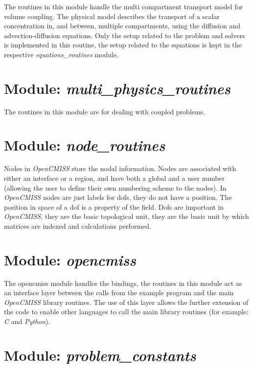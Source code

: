 The routines in this module handle the multi compartment transport model for 
volume coupling. The physical model describes the transport of a scalar 
concentration in, and between, multiple compartments, using the diffusion 
and advection-diffusion equations. Only the setup related to the problem and 
solvers is implemented in this routine, the setup related to the equations 
is kept in the respective \emph{equations\_routines} module. 


\section{Module: \emph{multi\_physics\_routines}}
\label{sec:multiphysicsroutines}

The routines in this module are for dealing with coupled problems.


\section{Module: \emph{node\_routines}}
\label{sec:noderoutines}

Nodes in \emph{OpenCMISS} store the nodal information. Nodes are 
associated with either an interface or a region, and have both a global 
and a user number (allowing the user to define their own numbering scheme 
to the nodes). In \emph{OpenCMISS} nodes are just labels for dofs, they 
do not have a position. The position in space of a dof is a property of 
the field. Dofs are important in \emph{OpenCMISS}, they are the basic 
topological unit, they are the basic unit by which matrices are indexed 
and calculations performed.


\section{Module: \emph{opencmiss}}
\label{sec:opencmiss}

The opencmiss module handles the bindings, the routines in this module act as 
an interface layer between the calls from the example program and the main 
\emph{OpenCMISS} library routines. The use of this layer allows the further 
extension of the code to enable other languages to call the main library 
routines (for example: \emph{C} and \emph{Python}).


\section{Module: \emph{problem\_constants}}
\label{sec:problemconstants}

